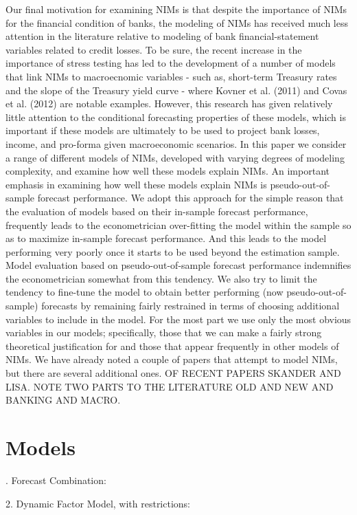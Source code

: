 \documentclass[12pt]{article}
\begin{document}
	Our final motivation for examining NIMs is that despite the importance of NIMs for the financial condition of banks, the modeling of NIMs has received much less attention in the literature relative to modeling of bank financial-statement variables related to credit losses.  To be sure, the recent increase in the importance of stress testing has led to the development of a number of models that link NIMs to macroecnomic variables - such as, short-term Treasury rates and the slope of the Treasury yield curve - where Kovner et al. (2011) and Covas et al. (2012) are notable examples.   However, this research has given relatively little attention to the conditional forecasting properties of these models, which is important if these models are ultimately to be used to project bank losses, income, and pro-forma given macroeconomic scenarios.
	In this paper we consider a range of different models of NIMs, developed with varying degrees of modeling complexity, and examine how well these models explain NIMs.  An important emphasis in examining how well these models explain NIMs is pseudo-out-of-sample forecast performance.  We adopt this approach for the simple reason that the evaluation of models based on their in-sample forecast performance, frequently leads to the econometrician over-fitting the model within the sample so as to maximize in-sample forecast performance.  And this leads to the model performing very poorly once it starts to be used beyond the estimation sample.  Model evaluation based on pseudo-out-of-sample forecast performance indemnifies the econometrician somewhat from this tendency.  We also try to limit the tendency to fine-tune the model to obtain better performing (now pseudo-out-of-sample) forecasts by remaining fairly restrained in terms of choosing additional variables to include in the model.  For the most part we use only the most obvious variables in our models; specifically, those that we can make a fairly strong theoretical justification for and those that appear frequently in other models of NIMs.
	We have already noted a couple of papers that attempt to model NIMs, but there are several additional ones.  OF RECENT PAPERS SKANDER AND LISA.  NOTE TWO PARTS TO THE LITERATURE OLD AND NEW AND BANKING AND MACRO.


\section{Models}
. Forecast Combination:

2. Dynamic Factor Model, with restrictions:
\end{document}
